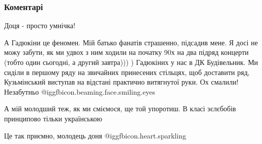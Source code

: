 
 
 
 
 
\subsubsection{Коментарі}

\begin{itemize} %

Доця - просто умнічка!

А Гадюкіни це феномен. Мій батько фанатів страшенно, підсадив мене. Я досі не
можу забути, як ми удвох з ним ходили на початку 90х на два підряд концерти
(тобто один сьогодні, а другий завтра))) ) Гадюкіних у нас в ДК Будівельник. Ми
сиділи в першому ряду на звичайних принесених стільцях, щоб доставити ряд,
Кузьмінський виступав на відстані практично витягнутої руки. Ох смалили!
Незабутньо  @igg{fbicon.beaming.face.smiling.eyes} 

\begin{itemize} %
 
А мій молодший теж, як ми сміємося, ще той упоротиш. В класі зєлєбобів принципово тільки українською
\end{itemize} %

 
Це так приємно, молодець доня @igg{fbicon.heart.sparkling} 

 

\end{itemize}
